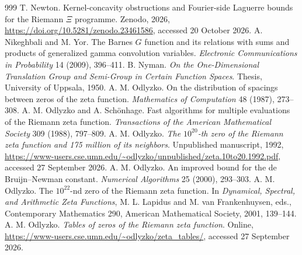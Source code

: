 \begin{thebibliography}{999}
 T. Newton. Kernel-concavity obstructions and Fourier-side Laguerre bounds for the Riemann $\Xi$ programme. Zenodo, 2026, \url{https://doi.org/10.5281/zenodo.23461586}, accessed 20 October 2026.
 A. Nikeghbali and M. Yor. The Barnes $G$ function and its relations with sums and products of generalized gamma convolution variables. \emph{Electronic Communications in Probability} 14 (2009), 396--411.
 B. Nyman. \emph{On the One-Dimensional Translation Group and Semi-Group in Certain Function Spaces}. Thesis, University of Uppsala, 1950.
 A. M. Odlyzko. On the distribution of spacings between zeros of the zeta function. \emph{Mathematics of Computation} 48 (1987), 273--308.
 A. M. Odlyzko and A. Sch\"onhage. Fast algorithms for multiple evaluations of the Riemann zeta function. \emph{Transactions of the American Mathematical Society} 309 (1988), 797--809.
 A. M. Odlyzko. \emph{The $10^{20}$-th zero of the Riemann zeta function and 175 million of its neighbors}. Unpublished manuscript, 1992, \url{https://www-users.cse.umn.edu/~odlyzko/unpublished/zeta.10to20.1992.pdf}, accessed 27 September 2026.
 A. M. Odlyzko. An improved bound for the de Bruijn--Newman constant. \emph{Numerical Algorithms} 25 (2000), 293--303.
 A. M. Odlyzko. The $10^{22}$-nd zero of the Riemann zeta function. In \emph{Dynamical, Spectral, and Arithmetic Zeta Functions}, M. L. Lapidus and M. van Frankenhuysen, eds., Contemporary Mathematics 290, American Mathematical Society, 2001, 139--144.
 A. M. Odlyzko. \emph{Tables of zeros of the Riemann zeta function}. Online, \url{https://www-users.cse.umn.edu/~odlyzko/zeta_tables/}, accessed 27 September 2026.

\end{thebibliography}
